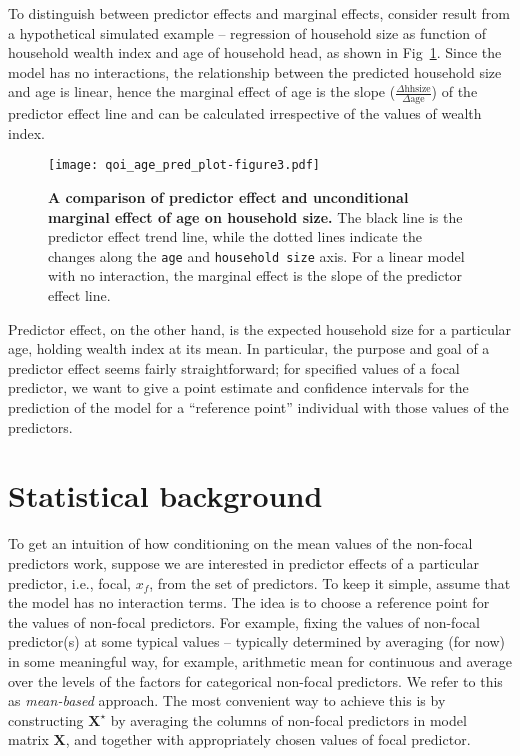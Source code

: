 \documentclass[10pt,letterpaper]{article}
\def\code#1{\texttt{#1}}
\newcommand{\bX}{{\mathbf X}}
\begin{document}
To distinguish between predictor effects and marginal effects, consider result from a hypothetical  simulated example -- regression of household size as function of household wealth index and age of household head, as shown in Fig~\ref{fig:qoi_age_pred_plot}. Since the model has no interactions, the relationship between the predicted household size and age is linear, hence the marginal effect of age is the slope ($\frac{\Delta \mathrm{hh size}}{\Delta \mathrm{age}}$) of the predictor effect line and can be calculated irrespective of the values of wealth index.

\begin{figure}[!h]
\centering
\texttt{[image: qoi\_age\_pred\_plot-figure3.pdf]}
\caption{{\bf A comparison of predictor effect and unconditional marginal effect of age on household size.} The black line is the predictor effect trend line, while the dotted lines indicate the changes along the \code{age} and \code{household size} axis. For a linear model with no interaction, the marginal effect is the slope of the predictor effect line.}
\label{fig:qoi_age_pred_plot}
\end{figure}

Predictor effect, on the other hand, is the expected household size for a particular age, holding wealth index at its mean. In particular, the purpose and goal of a predictor effect seems fairly straightforward; for specified values of a focal predictor, we want to give a point estimate and confidence intervals for the prediction of the model for a ``reference point'' individual with those values of the predictors.

\section*{Statistical background}

To get an intuition of how conditioning on the mean values of the non-focal predictors work, suppose we are interested in predictor effects of a particular predictor, i.e., focal, $x_f$, from the set of predictors. To keep it simple, assume that the model has no interaction terms. The idea is to choose a reference point for the values of non-focal predictors. For example, fixing the values of non-focal predictor(s) at some typical values -- typically determined by averaging (for now) in some meaningful way, for example, arithmetic mean  for continuous and average over the levels of the factors for categorical non-focal predictors. We refer to this as \emph{mean-based} approach. The most convenient way to achieve this is by constructing $\bX^\star$ by averaging the columns of non-focal predictors in model matrix $\bX$, and together with appropriately chosen values of focal predictor.
\end{document}
